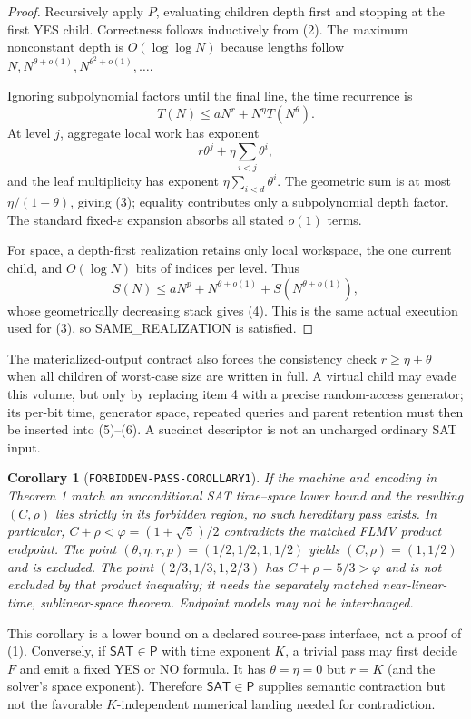 \documentclass[11pt]{article}
\newtheorem{corollary}[theorem]{Corollary}
\newcommand{\SAT}{\mathsf{SAT}}
\begin{document}
\begin{proof}
Recursively apply $P$, evaluating children depth first and stopping at the
first YES child.  Correctness follows inductively from (2).  The maximum
nonconstant depth is $O(\log\log N)$ because lengths follow
$N,N^{\theta+o(1)},N^{\theta^2+o(1)},\ldots$.

Ignoring subpolynomial factors until the final line, the time recurrence is
\[
 T(N)\le aN^r+N^\eta T(N^\theta).                       \tag{5}
\]
At level $j$, aggregate local work has exponent
\[
 r\theta^j+\eta\sum_{i<j}\theta^i,
\]
and the leaf multiplicity has exponent
$\eta\sum_{i<d}\theta^i$.  The geometric sum is at most
$\eta/(1-\theta)$, giving (3); equality contributes only a subpolynomial
depth factor.  The standard fixed-$\varepsilon$ expansion absorbs all stated
$o(1)$ terms.

For space, a depth-first realization retains only local workspace, the one
current child, and $O(\log N)$ bits of indices per level.  Thus
\[
 S(N)\le aN^p+N^{\theta+o(1)}+S(N^{\theta+o(1)}),        \tag{6}
\]
whose geometrically decreasing stack gives (4).  This is the same actual
execution used for (3), so SAME\_REALIZATION is satisfied.
\end{proof}

The materialized-output contract also forces the consistency check
$r\ge\eta+\theta$ when all children of worst-case size are written in full.
A virtual child may evade this volume, but only by replacing item 4 with a
precise random-access generator; its per-bit time, generator space, repeated
queries and parent retention must then be inserted into (5)--(6).  A succinct
descriptor is not an uncharged ordinary SAT input.

\begin{corollary}[\texttt{FORBIDDEN-PASS-COROLLARY1}]
If the machine and encoding in Theorem 1 match an unconditional SAT
time--space lower bound and the resulting $(C,\rho)$ lies strictly in its
forbidden region, no such hereditary pass exists.  In particular,
$C+\rho<\varphi=(1+\sqrt5)/2$ contradicts the matched FLMV product endpoint.
The point $(\theta,\eta,r,p)=(1/2,1/2,1,1/2)$ yields
$(C,\rho)=(1,1/2)$ and is excluded.  The point
$(2/3,1/3,1,2/3)$ has $C+\rho=5/3>\varphi$ and is not excluded by that
product inequality; it needs the separately matched near-linear-time,
sublinear-space theorem.  Endpoint models may not be interchanged.
\end{corollary}

This corollary is a lower bound on a declared source-pass interface, not a
proof of (1).  Conversely, if $\SAT\in\mathsf P$ with time exponent $K$, a
trivial pass may first decide $F$ and emit a fixed YES or NO formula.  It has
$\theta=\eta=0$ but $r=K$ (and the solver's space exponent).  Therefore
$\SAT\in\mathsf P$ supplies semantic contraction but not the favorable
$K$-independent numerical landing needed for contradiction.
\end{document}
